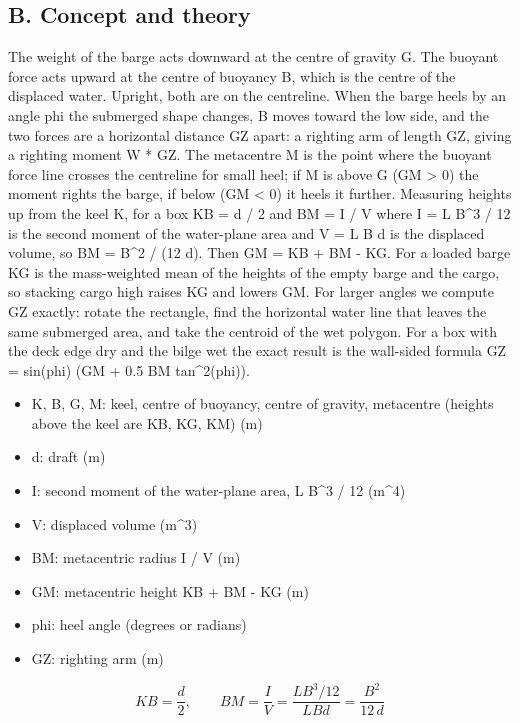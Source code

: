 \documentclass[11pt,a4paper]{article}
\begin{document}
\subsection*{B. Concept and theory}
The weight of the barge acts downward at the centre of gravity G. The buoyant force acts upward at the centre of buoyancy B, which is the centre of the displaced water. Upright, both are on the centreline. When the barge heels by an angle phi the submerged shape changes, B moves toward the low side, and the two forces are a horizontal distance GZ apart: a righting arm of length GZ, giving a righting moment W * GZ. The metacentre M is the point where the buoyant force line crosses the centreline for small heel; if M is above G (GM \textgreater{} 0) the moment rights the barge, if below (GM \textless{} 0) it heels it further. Measuring heights up from the keel K, for a box KB = d / 2 and BM = I / V where I = L B\textasciicircum{}3 / 12 is the second moment of the water-plane area and V = L B d is the displaced volume, so BM = B\textasciicircum{}2 / (12 d). Then GM = KB + BM - KG. For a loaded barge KG is the mass-weighted mean of the heights of the empty barge and the cargo, so stacking cargo high raises KG and lowers GM. For larger angles we compute GZ exactly: rotate the rectangle, find the horizontal water line that leaves the same submerged area, and take the centroid of the wet polygon. For a box with the deck edge dry and the bilge wet the exact result is the wall-sided formula GZ = sin(phi) (GM + 0.5 BM tan\textasciicircum{}2(phi)).

\begin{itemize}[nosep]
\item K, B, G, M: keel, centre of buoyancy, centre of gravity, metacentre (heights above the keel are KB, KG, KM) (m)
\item d: draft (m)
\item I: second moment of the water-plane area, L B\textasciicircum{}3 / 12 (m\textasciicircum{}4)
\item V: displaced volume (m\textasciicircum{}3)
\item BM: metacentric radius I / V (m)
\item GM: metacentric height KB + BM - KG (m)
\item phi: heel angle (degrees or radians)
\item GZ: righting arm (m)
\end{itemize}

\begin{equation*}
KB=\frac{d}{2},\qquad BM=\frac{I}{V}=\frac{L B^3/12}{L B d}=\frac{B^2}{12\,d}
\end{equation*}
\end{document}
